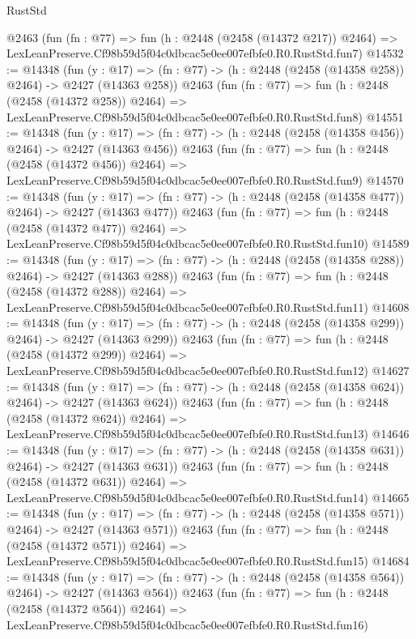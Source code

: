 \begin{lexlean}{RustStd}
\begin{coremodule}
    @2463
    (fun (fn : @77) =>
    fun (h : @2448 (@2458 (@14372 @217)) @2464) =>
    LexLeanPreserve.Cf98b59d5f04c0dbcac5e0ee007efbfe0.R0.RustStd.fun7)
@14532 := @14348
    (fun (y : @17) => (fn : @77) -> (h : @2448 (@2458 (@14358 @258)) @2464) -> @2427 (@14363 @258))
    @2463
    (fun (fn : @77) =>
    fun (h : @2448 (@2458 (@14372 @258)) @2464) =>
    LexLeanPreserve.Cf98b59d5f04c0dbcac5e0ee007efbfe0.R0.RustStd.fun8)
@14551 := @14348
    (fun (y : @17) => (fn : @77) -> (h : @2448 (@2458 (@14358 @456)) @2464) -> @2427 (@14363 @456))
    @2463
    (fun (fn : @77) =>
    fun (h : @2448 (@2458 (@14372 @456)) @2464) =>
    LexLeanPreserve.Cf98b59d5f04c0dbcac5e0ee007efbfe0.R0.RustStd.fun9)
@14570 := @14348
    (fun (y : @17) => (fn : @77) -> (h : @2448 (@2458 (@14358 @477)) @2464) -> @2427 (@14363 @477))
    @2463
    (fun (fn : @77) =>
    fun (h : @2448 (@2458 (@14372 @477)) @2464) =>
    LexLeanPreserve.Cf98b59d5f04c0dbcac5e0ee007efbfe0.R0.RustStd.fun10)
@14589 := @14348
    (fun (y : @17) => (fn : @77) -> (h : @2448 (@2458 (@14358 @288)) @2464) -> @2427 (@14363 @288))
    @2463
    (fun (fn : @77) =>
    fun (h : @2448 (@2458 (@14372 @288)) @2464) =>
    LexLeanPreserve.Cf98b59d5f04c0dbcac5e0ee007efbfe0.R0.RustStd.fun11)
@14608 := @14348
    (fun (y : @17) => (fn : @77) -> (h : @2448 (@2458 (@14358 @299)) @2464) -> @2427 (@14363 @299))
    @2463
    (fun (fn : @77) =>
    fun (h : @2448 (@2458 (@14372 @299)) @2464) =>
    LexLeanPreserve.Cf98b59d5f04c0dbcac5e0ee007efbfe0.R0.RustStd.fun12)
@14627 := @14348
    (fun (y : @17) => (fn : @77) -> (h : @2448 (@2458 (@14358 @624)) @2464) -> @2427 (@14363 @624))
    @2463
    (fun (fn : @77) =>
    fun (h : @2448 (@2458 (@14372 @624)) @2464) =>
    LexLeanPreserve.Cf98b59d5f04c0dbcac5e0ee007efbfe0.R0.RustStd.fun13)
@14646 := @14348
    (fun (y : @17) => (fn : @77) -> (h : @2448 (@2458 (@14358 @631)) @2464) -> @2427 (@14363 @631))
    @2463
    (fun (fn : @77) =>
    fun (h : @2448 (@2458 (@14372 @631)) @2464) =>
    LexLeanPreserve.Cf98b59d5f04c0dbcac5e0ee007efbfe0.R0.RustStd.fun14)
@14665 := @14348
    (fun (y : @17) => (fn : @77) -> (h : @2448 (@2458 (@14358 @571)) @2464) -> @2427 (@14363 @571))
    @2463
    (fun (fn : @77) =>
    fun (h : @2448 (@2458 (@14372 @571)) @2464) =>
    LexLeanPreserve.Cf98b59d5f04c0dbcac5e0ee007efbfe0.R0.RustStd.fun15)
@14684 := @14348
    (fun (y : @17) => (fn : @77) -> (h : @2448 (@2458 (@14358 @564)) @2464) -> @2427 (@14363 @564))
    @2463
    (fun (fn : @77) =>
    fun (h : @2448 (@2458 (@14372 @564)) @2464) =>
    LexLeanPreserve.Cf98b59d5f04c0dbcac5e0ee007efbfe0.R0.RustStd.fun16)

\end{coremodule}
\end{lexlean}
